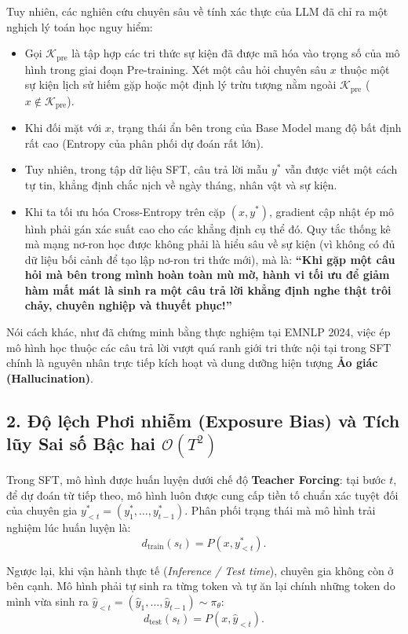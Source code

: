 Tuy nhiên, các nghiên cứu chuyên sâu về tính xác thực của LLM \citep{kang2024unfamiliar, gekhman2024does} đã chỉ ra một nghịch lý toán học nguy hiểm:
\begin{itemize}[leftmargin=1.2cm]
    \item Gọi $\mathcal{K}_{\text{pre}}$ là tập hợp các tri thức sự kiện đã được mã hóa vào trọng số của mô hình trong giai đoạn Pre-training. Xét một câu hỏi chuyên sâu $x$ thuộc một sự kiện lịch sử hiếm gặp hoặc một định lý trừu tượng nằm ngoài $\mathcal{K}_{\text{pre}}$ ($x \notin \mathcal{K}_{\text{pre}}$).
    \item Khi đối mặt với $x$, trạng thái ẩn bên trong của Base Model mang độ bất định rất cao (Entropy của phân phối dự đoán rất lớn).
    \item Tuy nhiên, trong tập dữ liệu SFT, câu trả lời mẫu $y^*$ vẫn được viết một cách tự tin, khẳng định chắc nịch về ngày tháng, nhân vật và sự kiện.
    \item Khi ta tối ưu hóa Cross-Entropy trên cặp $(x, y^*)$, gradient cập nhật ép mô hình phải gán xác suất cao cho các khẳng định cụ thể đó. Quy tắc thống kê mà mạng nơ-ron học được không phải là hiểu sâu về sự kiện (vì không có đủ dữ liệu bối cảnh để tạo lập nơ-ron tri thức mới), mà là: \textbf{``Khi gặp một câu hỏi mà bên trong mình hoàn toàn mù mờ, hành vi tối ưu để giảm hàm mất mát là sinh ra một câu trả lời khẳng định nghe thật trôi chảy, chuyên nghiệp và thuyết phục!''}
\end{itemize}
Nói cách khác, như \citet{gekhman2024does} đã chứng minh bằng thực nghiệm tại EMNLP 2024, việc ép mô hình học thuộc các câu trả lời vượt quá ranh giới tri thức nội tại trong SFT chính là nguyên nhân trực tiếp kích hoạt và dung dưỡng hiện tượng \textbf{Ảo giác (Hallucination)}.

\subsection{2. Độ lệch Phơi nhiễm (Exposure Bias) và Tích lũy Sai số Bậc hai $\mathcal{O}(T^2)$}
Trong SFT, mô hình được huấn luyện dưới chế độ \textbf{Teacher Forcing}: tại bước $t$, để dự đoán từ tiếp theo, mô hình luôn được cung cấp tiền tố chuẩn xác tuyệt đối của chuyên gia $y_{<t}^* = (y_1^*, \dots, y_{t-1}^*)$. Phân phối trạng thái mà mô hình trải nghiệm lúc huấn luyện là:
\begin{equation}
    d_{\text{train}}(s_t) = P(x, y_{<t}^*).
\end{equation}

Ngược lại, khi vận hành thực tế (\textit{Inference / Test time}), chuyên gia không còn ở bên cạnh. Mô hình phải tự sinh ra từng token và tự ăn lại chính những token do mình vừa sinh ra $\hat{y}_{<t} = (\hat{y}_1, \dots, \hat{y}_{t-1}) \sim \pi_\theta$:
\begin{equation}
    d_{\text{test}}(s_t) = P(x, \hat{y}_{<t}).
\end{equation}

